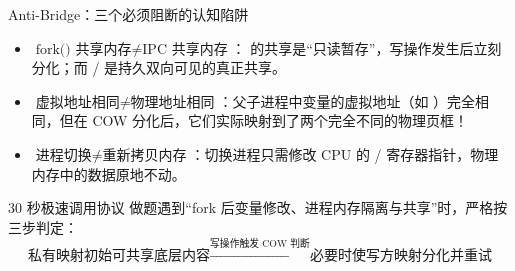 \documentclass[UTF8,fontset=none,11pt,a4paper]{ctexart}
\begin{document}
\begin{warnbox}{Anti-Bridge：三个必须阻断的认知陷阱}
\begin{itemize}
  \item \(\text{fork() 共享内存} \neq \text{IPC 共享内存}\)： 的共享是“只读暂存”，写操作发生后立刻分化；而 / 是持久双向可见的真正共享。
  \item \(\text{虚拟地址相同} \neq \text{物理地址相同}\)：父子进程中变量的虚拟地址（如 ）完全相同，但在 COW 分化后，它们实际映射到了两个完全不同的物理页框！
  \item \(\text{进程切换} \neq \text{重新拷贝内存}\)：切换进程只需修改 CPU 的 / 寄存器指针，物理内存中的数据原地不动。
\end{itemize}
\end{warnbox}

\begin{corebox}{30 秒极速调用协议}
做题遇到“fork 后变量修改、进程内存隔离与共享”时，严格按三步判定：
\[
\boxed{\text{私有映射初始可共享底层内容}} \xrightarrow{\text{写操作触发 COW 判断}} \boxed{\text{必要时使写方映射分化并重试}}
\]
\end{corebox}
\end{document}

